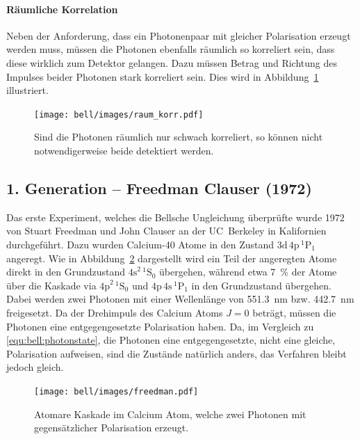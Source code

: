 \begin{refsection}
\paragraph{R\"aumliche Korrelation}
Neben der Anforderung, dass ein Photonenpaar mit gleicher Polarisation erzeugt
werden muss, m\"ussen die Photonen ebenfalls r\"aumlich so korreliert sein,
dass diese wirklich zum Detektor gelangen.
Dazu m\"ussen Betrag und Richtung des Impulses beider Photonen stark korreliert
sein. Dies wird in Abbildung~\ref{fig:bell:raum_korr} illustriert.

\begin{figure}
    \centering
    \texttt{[image: bell/images/raum\_korr.pdf]}
    \caption{Sind die Photonen r\"aumlich nur schwach korreliert,
    so k\"onnen nicht notwendigerweise beide detektiert werden.}
    \label{fig:bell:raum_korr}
\end{figure}

\subsection{1. Generation -- Freedman Clauser (1972)}
Das erste Experiment, welches die Bellsche Ungleichung \"uberpr\"ufte
wurde 1972 von Stuart Freedman und John Clauser an der UC~Berkeley
in Kalifornien durchgef\"uhrt.
\cite{Bell:Freedman1972}
Dazu wurden Calcium-40 Atome in den Zustand $\text{3d}\,\text{4p}\,^1\text{P}_1$
angeregt. 
Wie in Abbildung~\ref{fig:bell:freedman} dargestellt wird ein Teil der
angeregten Atome direkt in den Grundzustand $\text{4s}^2\,^1\text{S}_0$
\"ubergehen, w\"ahrend etwa \SI{7}{\percent} der Atome \"uber die Kaskade
via $\text{4p}^2\,^1\text{S}_0$ und $\text{4p}\,\text{4s}\,^1\text{P}_1$ 
in den Grundzustand \"ubergehen.
Dabei werden zwei Photonen mit einer Wellenl\"ange von \SI{551.3}{\nano\meter}
bzw. \SI{442.7}{\nano\meter} freigesetzt. 
Da der Drehimpuls des Calcium Atoms $J=0$ betr\"agt, m\"ussen die Photonen
eine entgegengesetzte Polarisation haben.
Da, im Vergleich zu \eqref{equ:bell:photonstate}, die Photonen eine
entgegengesetzte, nicht eine gleiche, Polarisation aufweisen, sind die 
Zust\"ande nat\"urlich anders, das Verfahren bleibt jedoch gleich.

\begin{figure}
    \centering
    \texttt{[image: bell/images/freedman.pdf]}
    \caption{Atomare Kaskade im Calcium Atom, welche zwei Photonen mit
    gegens\"atzlicher Polarisation erzeugt. \cite{Bell:Freedman1972}}
    \label{fig:bell:freedman}
\end{figure}


\end{refsection}
